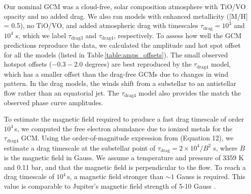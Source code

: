 \documentclass[twocolumn]{aastex61}
\begin{document}
Our nominal GCM was a cloud-free, solar composition atmosphere with TiO/VO opacity and no added drag.  We also ran models with enhanced metallicity ([M/H] = 0.5), no TiO/VO, and added atmospheric drag with timescales $\tau_\mathrm{drag} = 10^3$ and $10^4$ s, which we label $\tau_\mathrm{drag3}$ and $\tau_\mathrm{drag4}$, respectively.  To assess how well the GCM predictions reproduce the data, we calculated the amplitude and hot spot offset for all the models (listed in Table\,\ref{table:amps_offsets}). The small observed hotspot offsets ($-0.3 - 2.0$ degrees) are best reproduced by the $\tau_\mathrm{drag4}$ model, which has a smaller offset than the drag-free GCMs due to changes in wind pattern. In the drag models, the winds shift from a substellar to an antistellar flow rather than an equatorial jet.  The $\tau_\mathrm{drag4}$ model also provides the match the observed phase curve amplitudes. 


To estimate the magnetic field required to produce a fast drag timescale of order $10^4$\,s, we computed the free electron abundance due to ionized metals for the $\tau_\mathrm{drag4}$ GCM. Using the order-of-magnitude expression from \cite{perna10} (Equation 12), we estimate a drag timescale at the substellar point of $\tau_\mathrm{drag}  = 2\times10^4/B^2$ s, where $B$ is the magnetic field in Gauss. We assume a temperature and pressure of 3359 K and 0.11 bar, %
and that the magnetic field is perpendicular to the flow. To reach a drag timescale of $10^4$\,s, a magnetic field stronger than $\sim1$ Gauss is required. This value is comparable to Jupiter's magnetic field strength of 5-10 Gauss \citep{bagenal04}.
\end{document}
